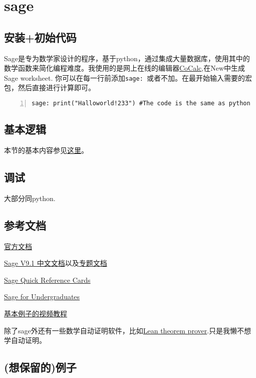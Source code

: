 \documentclass[11pt]{amsart}
\begin{document}
\begin{lstlisting}[language=iPython]
\end{lstlisting}
\section{sage}
\subsection{安装+初始代码}
Sage是专为数学家设计的程序，基于python，通过集成大量数据库，使用其中的数学函数来简化编程难度。我使用的是网上在线的编辑器\href{https://cocalc.com/projects}{CoCalc},在New中生成Sage worksheet.
你可以在每一行前添加\lstinline|sage: |或者不加。在最开始输入需要的宏包，然后直接进行计算即可。

\begin{lstlisting}[numbers=left,numberstyle=\tiny,numbersep=10pt]
sage: print("Halloworld!233") #The code is the same as python
\end{lstlisting}
\subsection{基本逻辑}
本节的基本内容参见\href{https://www.osgeo.cn/sagemath/thematic_tutorials/tutorial-programming-python.html#tutorial-programming-python}{这里}。
\subsection{调试}
大部分同python.

\subsection{参考文档}
\href{https://doc.sagemath.org/}{官方文档}

\href{https://www.osgeo.cn/sagemath/index.html}{Sage V9.1 中文文档}以及\href{https://www.osgeo.cn/sagemath/thematic_tutorials/}{专题文档}

\href{https://wiki.sagemath.org/quickref}{Sage Quick Reference Cards}

\href{http://gregorybard.com/Sage.html}{Sage for Undergraduates}

\href{https://www.youtube.com/watch?v=A4j3qbCn1PM&list=PLYpVTXjEi1odEHr_-4fkbudq-gQnljSso&index=3}{基本例子的视频教程}

除了sage外还有一些数学自动证明软件，比如\href{https://leanprover-community.github.io/}{Lean theorem prover}.只是我懒不想学自动证明。
\subsection{(想保留的)例子}
\end{document}
